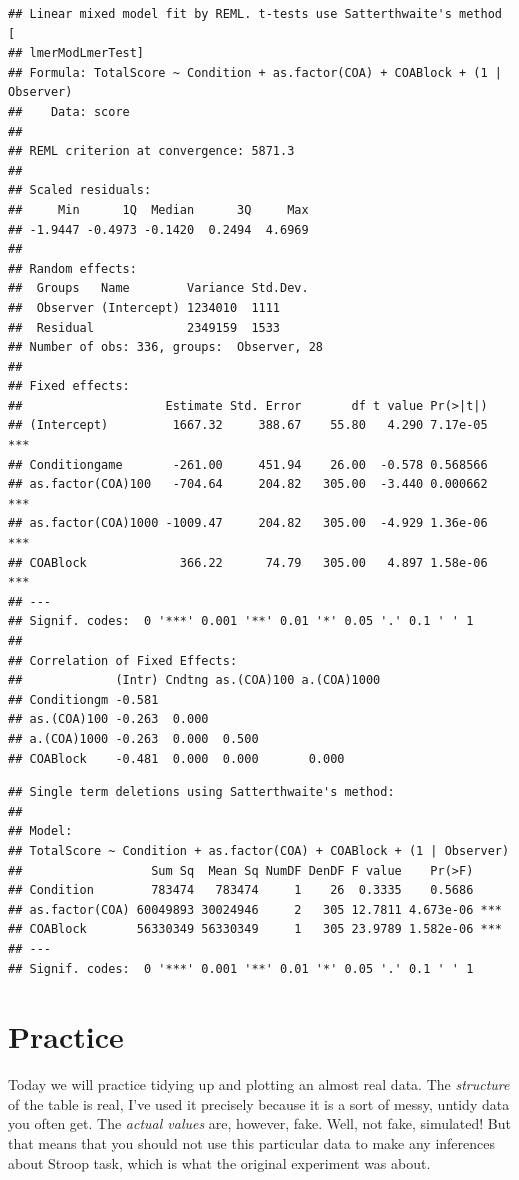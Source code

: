 \documentclass[
]{book}
\begin{document}
\begin{verbatim}
## Linear mixed model fit by REML. t-tests use Satterthwaite's method [
## lmerModLmerTest]
## Formula: TotalScore ~ Condition + as.factor(COA) + COABlock + (1 | Observer)
##    Data: score
## 
## REML criterion at convergence: 5871.3
## 
## Scaled residuals: 
##     Min      1Q  Median      3Q     Max 
## -1.9447 -0.4973 -0.1420  0.2494  4.6969 
## 
## Random effects:
##  Groups   Name        Variance Std.Dev.
##  Observer (Intercept) 1234010  1111    
##  Residual             2349159  1533    
## Number of obs: 336, groups:  Observer, 28
## 
## Fixed effects:
##                    Estimate Std. Error       df t value Pr(>|t|)    
## (Intercept)         1667.32     388.67    55.80   4.290 7.17e-05 ***
## Conditiongame       -261.00     451.94    26.00  -0.578 0.568566    
## as.factor(COA)100   -704.64     204.82   305.00  -3.440 0.000662 ***
## as.factor(COA)1000 -1009.47     204.82   305.00  -4.929 1.36e-06 ***
## COABlock             366.22      74.79   305.00   4.897 1.58e-06 ***
## ---
## Signif. codes:  0 '***' 0.001 '**' 0.01 '*' 0.05 '.' 0.1 ' ' 1
## 
## Correlation of Fixed Effects:
##             (Intr) Cndtng as.(COA)100 a.(COA)1000
## Conditiongm -0.581                               
## as.(COA)100 -0.263  0.000                        
## a.(COA)1000 -0.263  0.000  0.500                 
## COABlock    -0.481  0.000  0.000       0.000
\end{verbatim}

\begin{verbatim}
## Single term deletions using Satterthwaite's method:
## 
## Model:
## TotalScore ~ Condition + as.factor(COA) + COABlock + (1 | Observer)
##                  Sum Sq  Mean Sq NumDF DenDF F value    Pr(>F)    
## Condition        783474   783474     1    26  0.3335    0.5686    
## as.factor(COA) 60049893 30024946     2   305 12.7811 4.673e-06 ***
## COABlock       56330349 56330349     1   305 23.9789 1.582e-06 ***
## ---
## Signif. codes:  0 '***' 0.001 '**' 0.01 '*' 0.05 '.' 0.1 ' ' 1
\end{verbatim}

\hypertarget{seminar12}{%
\chapter{Practice}\label{seminar12}}

Today we will practice tidying up and plotting an almost real data. The \emph{structure} of the table is real, I've used it precisely because it is a sort of messy, untidy data you often get. The \emph{actual values} are, however, fake. Well, not fake, simulated! But that means that you should not use this particular data to make any inferences about Stroop task, which is what the original experiment was about.
\end{document}
